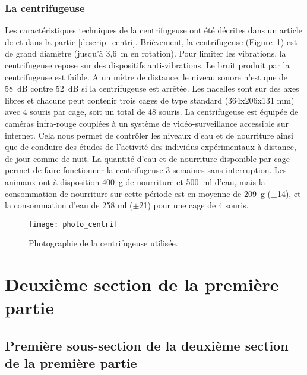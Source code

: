 \subsubsection{La centrifugeuse}
Les caractéristiques techniques de la centrifugeuse ont été décrites dans un article de \citet{Jamon2009} et dans la partie \ref{descrip_centri}. Brièvement, la centrifugeuse (Figure~\ref{photo_centri}) est de grand diamètre (jusqu'à 3,6~m en rotation). Pour limiter les vibrations, la centrifugeuse repose sur des dispositifs anti-vibrations. Le bruit produit par la centrifugeuse est faible. A un mètre de distance, le niveau sonore n'est que de 58~dB contre 52~dB si la centrifugeuse est arrêtée. Les nacelles sont sur des axes libres et chacune peut contenir trois cages de type standard (364x206x131 mm) avec 4 souris par cage, soit un total de 48 souris. La centrifugeuse est équipée de caméras infra-rouge couplées à un système de vidéo-surveillance accessible sur internet. Cela nous permet de contrôler les niveaux d'eau et de nourriture ainsi que de conduire des études de l'activité des individus expérimentaux à distance, de jour comme de nuit. La quantité d'eau et de nourriture disponible par cage permet de faire fonctionner la centrifugeuse 3 semaines sans interruption. Les animaux ont à disposition 400~g de nourriture et 500~ml d'eau, mais la consommation de nourriture sur cette période est en moyenne de 209~g ($\pm$14), et la consommation d'eau de 258 ml ($\pm$21) pour une cage de 4 souris. 
\begin{figure}[h!tbp]
\vspace{0.5cm}
\setcapindent{2em}
  \centering
  \texttt{[image: photo\_centri]}
  \caption[Photographie de la centrifugeuse]{Photographie de la centrifugeuse utilisée. \label{photo_centri}}
\end{figure}
\lipsum[1]

\section{Deuxième section de la première partie}
\subsection{Première sous-section de la deuxième section de la première partie}
\lipsum[1-2]
